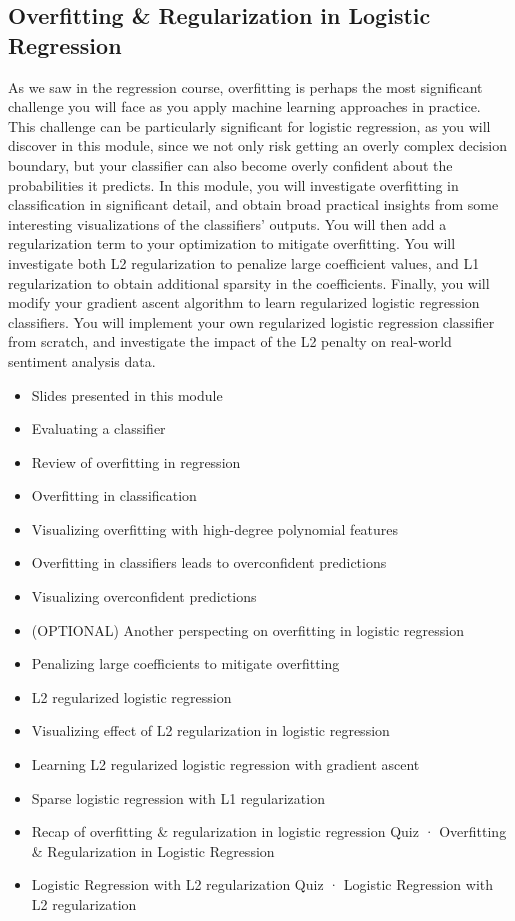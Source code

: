 \subsection{Overfitting \& Regularization in Logistic Regression}
As we saw in the regression course, overfitting is perhaps the most significant challenge you will face as you apply machine learning approaches in practice. This challenge can be particularly significant for logistic regression, as you will discover in this module, since we not only risk getting an overly complex decision boundary, but your classifier can also become overly confident about the probabilities it predicts. In this module, you will investigate overfitting in classification in significant detail, and obtain broad practical insights from some interesting visualizations of the classifiers' outputs. You will then add a regularization term to your optimization to mitigate overfitting. You will investigate both L2 regularization to penalize large coefficient values, and L1 regularization to obtain additional sparsity in the coefficients. Finally, you will modify your gradient ascent algorithm to learn regularized logistic regression classifiers. You will implement your own regularized logistic regression classifier from scratch, and investigate the impact of the L2 penalty on real-world sentiment analysis data.
\begin{itemize}
\item Slides presented in this module
\item Evaluating a classifier
\item Review of overfitting in regression
\item Overfitting in classification
\item Visualizing overfitting with high-degree polynomial features
\item Overfitting in classifiers leads to overconfident predictions
\item Visualizing overconfident predictions
\item (OPTIONAL) Another perspecting on overfitting in logistic regression
\item Penalizing large coefficients to mitigate overfitting
\item L2 regularized logistic regression
\item Visualizing effect of L2 regularization in logistic regression
\item Learning L2 regularized logistic regression with gradient ascent
\item Sparse logistic regression with L1 regularization
\item Recap of overfitting \& regularization in logistic regression
Quiz · Overfitting \& Regularization in Logistic Regression
\item Logistic Regression with L2 regularization
Quiz · Logistic Regression with L2 regularization
\end{itemize}
\newpage
